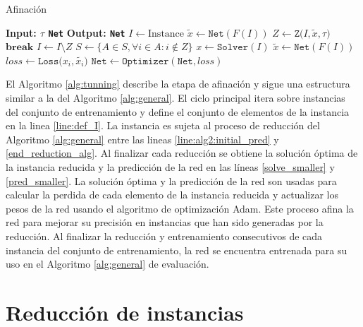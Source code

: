 \documentclass[spanish, a4paper, 12pt, openany,final]{book}
\begin{document}
\begin{algorithm}[H]
	\caption{Afinación}\label{alg:tunning}
	\begin{algorithmic}[1]
		\Statex \textbf{Input: $\tau$ \texttt{Net}}
		\Statex \textbf{Output: \texttt{Net}}
				\State $I \gets \text{Instance}$ \label{line:def_I}
				\Loop
					\State $\tilde{x} \gets \texttt{Net}(F(I))$   \label{line:alg2:initial_pred}
					\State $Z \gets \texttt{Z($I,\tilde{x},\tau$)}$ \label{start_reduction_alg}
						\State $\textbf{break}$ 
					\EndIf
					\State $I \gets I\setminus Z$ \label{alg1:update_I_2}
					\State $S \gets \{A \in S, \forall i \in A: i \notin Z\}$  \label{end_reduction_alg}
				\State $x \gets \texttt{Solver}(I)$   \label{solve_smaller}
				\State $\tilde{x} \gets \texttt{Net}(F(I))$  \label{pred_smaller}
				\State $loss \gets \texttt{Loss($x_i,\tilde{x_i})$}$ \label{smaller_loss}
				\State $\texttt{Net} \gets \texttt{Optimizer}(\texttt{Net},loss)$	  \label{smaller_optim}
			\EndFor
			\EndLoop
		\EndFor
	\end{algorithmic}
\end{algorithm}

El Algoritmo \ref{alg:tunning} describe la etapa de afinación y sigue una estructura similar a la del Algoritmo \ref{alg:general}. El ciclo principal itera sobre instancias del conjunto de entrenamiento y define el conjunto de elementos de la instancia en la linea \ref{line:def_I}. La instancia es sujeta al proceso de reducción del Algoritmo \ref{alg:general} entre las lineas \ref{line:alg2:initial_pred} y \ref{end_reduction_alg}. Al finalizar cada reducción se obtiene la solución óptima de la instancia reducida y la predicción de la red en las líneas \ref{solve_smaller} y \ref{pred_smaller}. La solución óptima y la predicción de la red son usadas para calcular la perdida de cada elemento de la instancia reducida y actualizar los pesos de la red usando el algoritmo de optimización Adam. Este proceso afina la red para mejorar su precisión en instancias que han sido generadas por la reducción. Al finalizar la reducción y entrenamiento consecutivos de cada instancia del conjunto de entrenamiento, la red se encuentra entrenada para su uso en el Algoritmo \ref{alg:general} de evaluación.


 \section{Reducción de instancias}
 
\end{document}
